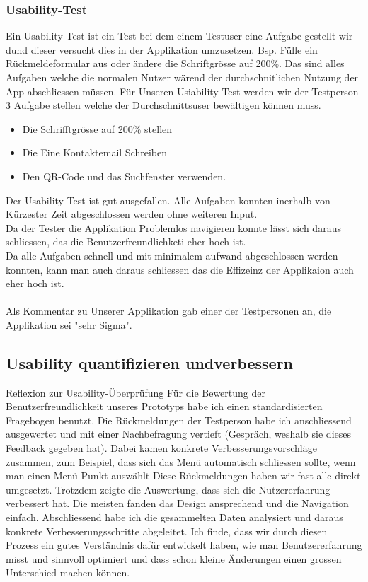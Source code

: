 \documentclass[10pt]{article}
\newcounter{subsubsubsection}[subsubsection]
\begin{document}
	\subsubsection{Usability-Test}
	Ein Usability-Test ist ein Test bei dem einem Testuser eine Aufgabe gestellt wir dund dieser versucht dies in der Applikation umzusetzen. Bsp. Fülle ein Rückmeldeformular aus oder ändere die Schriftgrösse auf 200\%. Das sind alles Aufgaben welche die normalen Nutzer wärend der durchschnitlichen Nutzung der App abschliessen müssen.
	Für Unseren Usiability Test werden wir der Testperson 3 Aufgabe stellen welche der Durchschnittsuser bewältigen können muss.
	\begin{itemize}
		\item Die Schrifftgrösse auf 200\% stellen
		\item Die Eine Kontaktemail Schreiben
		\item Den QR-Code und das Suchfenster verwenden.
	\end{itemize}
	Der Usability-Test ist gut ausgefallen. Alle Aufgaben konnten inerhalb von Kürzester Zeit abgeschlossen werden ohne weiteren Input.\\
	Da der Tester die Applikation Problemlos navigieren konnte lässt sich daraus schliessen, das die Benutzerfreundlichketi eher hoch ist.\\
	Da alle Aufgaben schnell und mit minimalem aufwand abgeschlossen werden konnten, kann man auch daraus schliessen das die Effizeinz der Applikaion auch eher hoch ist.
	\\\\
	Als Kommentar zu Unserer Applikation gab einer der Testpersonen an, die Applikation sei "sehr Sigma".
	\subsection{Usability quantifizieren undverbessern}
	Reflexion zur Usability-Überprüfung
	Für die Bewertung der Benutzerfreundlichkeit unseres Prototyps habe ich einen standardisierten Fragebogen benutzt. Die Rückmeldungen der Testperson habe ich anschliessend ausgewertet und mit einer Nachbefragung vertieft (Gespräch, weshalb sie dieses Feedback gegeben hat). Dabei kamen konkrete Verbesserungsvorschläge zusammen, zum Beispiel, dass sich das Menü automatisch schliessen sollte, wenn man einen Menü-Punkt auswählt
	Diese Rückmeldungen haben wir fast alle direkt umgesetzt. Trotzdem zeigte die Auswertung, dass sich die Nutzererfahrung verbessert hat. Die meisten fanden das Design ansprechend und die Navigation einfach.
	Abschliessend habe ich die gesammelten Daten analysiert und daraus konkrete Verbesserungsschritte abgeleitet. Ich finde, dass wir durch diesen Prozess ein gutes Verständnis dafür entwickelt haben, wie man Benutzererfahrung misst und sinnvoll optimiert und dass schon kleine Änderungen einen grossen Unterschied machen können.
	
\end{document}
